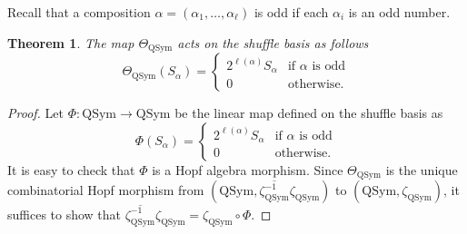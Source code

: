 \documentclass[12pt]{amsart}
\newtheorem{theorem}{Theorem}[section]
\numberwithin{equation}{section}
\newcommand{\QSym}{\mathrm{QSym}}
\begin{document}
Recall that a composition $\alpha=(\alpha_1,\dots,\alpha_\ell)$ is odd if each $\alpha_i$ is an odd number.

\begin{theorem}\label{thm:theta}
	The map $\Theta_\QSym$ acts on the shuffle basis as follows
	$$\Theta_\QSym(S_\alpha)=\left\{\begin{array}{cc}
		2^{\ell(\alpha)}S_\alpha & \text{if }\alpha \text{ is odd}\\
		0& \text{otherwise.}
		\end{array}\right.$$
\end{theorem}

\begin{proof}
	Let $\Phi:\QSym\to\QSym$ be the linear map defined on the shuffle basis as
	$$\Phi(S_\alpha)=\left\{\begin{array}{cc}
	2^{\ell(\alpha)}S_\alpha & \text{if }\alpha \text{ is odd}\\
	0& \text{otherwise.}
	\end{array}\right.$$
	It is easy to check that $\Phi$ is a Hopf algebra morphism.
	Since $\Theta_\QSym$ is the unique combinatorial Hopf morphism from $(\QSym,\overline{\zeta_\QSym^{-1}}\zeta_\QSym)$ to $(\QSym,\zeta_\QSym)$, it suffices to show that $\overline{\zeta_\QSym^{-1}}\zeta_\QSym=\zeta_\QSym\circ\Phi$.
	

\end{proof}
\end{document}
